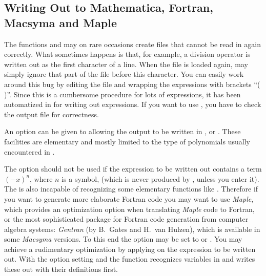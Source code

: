 \beom
{}
\enom

\subsection{Writing Out to Mathematica, Fortran, Macsyma and Maple}
\label{write2}

The \mma functions  and  may on rare occasions create files 
that cannot  be read in again correctly. What sometimes happens is that, for 
example, a division operator is written out as the first character of a line.
When the file is loaded again, \mma may simply ignore that part  of the file
before this character.
You can easily work around this bug 
by editing the file and wrapping  
the expressions with brackets ``( )''. Since this is a cumbersome
procedure for lots of expressions, it has been automatized in 
 for writing out expressions. 
If you want to use , you have to check 
the output file for correctness.

An option can be given to  allowing the 
output to be written in ,  or 
. These facilities are elementary and mostly limited to the 
type of polynomials usually encountered in \fc. 

The  option should not be used if the expression to be 
written out contains a term $(-x)^n$, where $n$ is a symbol, (which is never
produced by \fc, unless you enter it).
The \mma {} is also incapable of recognizing some elementary 
functions like . 
Therefore if you want to generate more elaborate Fortran code  you may want 
to use {\it Maple}, which provides an optimization option when 
translating {\it Maple} code to Fortran, or 
the most sophisticated package for Fortran code generation from 
computer algebra systems: {\it Gentran} (by B.~Gates and H.~van Hulzen),
which is available in some {\it Macsyma} versions. To this end the  option  may be set to  or .
You may achieve a rudimentary optimization by applying  on 
the expression to be written out. With the option setting  
and  the function  recognizes variables in 
 and writes these out with their definitions first.

